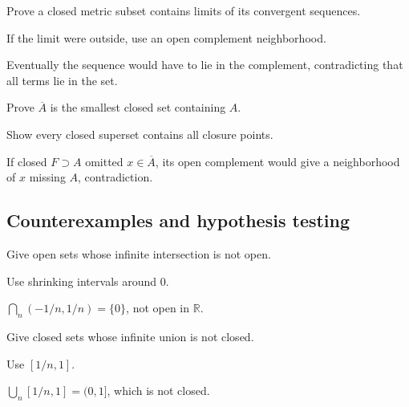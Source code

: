 \begin{exercise}\label{exr:ii04-expand-08}
Prove a closed metric subset contains limits of its convergent sequences.
\end{exercise}
\begin{hint}
If the limit were outside, use an open complement neighborhood.
\end{hint}
\begin{solution}
Eventually the sequence would have to lie in the complement, contradicting that all terms lie in the set.
\end{solution}

\begin{exercise}\label{exr:ii04-expand-09}
Prove \(\overline A\) is the smallest closed set containing \(A\).
\end{exercise}
\begin{hint}
Show every closed superset contains all closure points.
\end{hint}
\begin{solution}
If closed \(F\supset A\) omitted \(x\in\overline A\), its open complement would give a neighborhood of \(x\) missing \(A\), contradiction.
\end{solution}

\subsection*{Counterexamples and hypothesis testing}

\begin{exercise}\label{exr:ii04-expand-10}
Give open sets whose infinite intersection is not open.
\end{exercise}
\begin{hint}
Use shrinking intervals around \(0\).
\end{hint}
\begin{solution}
\(\bigcap_n(-1/n,1/n)=\{0\}\), not open in \(\mathbb R\).
\end{solution}

\begin{exercise}\label{exr:ii04-expand-11}
Give closed sets whose infinite union is not closed.
\end{exercise}
\begin{hint}
Use \([1/n,1]\).
\end{hint}
\begin{solution}
\(\bigcup_n[1/n,1]=(0,1]\), which is not closed.
\end{solution}

